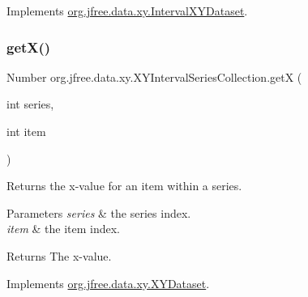 Implements \mbox{\hyperlink{interfaceorg_1_1jfree_1_1data_1_1xy_1_1_interval_x_y_dataset_aed1acf6e36561ce5acc3f6811a2ecef9}{org.\+jfree.\+data.\+xy.\+Interval\+X\+Y\+Dataset}}.

\mbox{\label{classorg_1_1jfree_1_1data_1_1xy_1_1_x_y_interval_series_collection_a0abae4cd2bcaab48244751b896c0ee5d}} 
\subsubsection{\texorpdfstring{get\+X()}{getX()}}
{\footnotesize\ttfamily Number org.\+jfree.\+data.\+xy.\+X\+Y\+Interval\+Series\+Collection.\+getX (\begin{DoxyParamCaption}\item[{int}]{series,  }\item[{int}]{item }\end{DoxyParamCaption})}

Returns the x-\/value for an item within a series.


\begin{DoxyParams}{Parameters}
{\em series} & the series index. \\
\hline
{\em item} & the item index.\\
\hline
\end{DoxyParams}
\begin{DoxyReturn}{Returns}
The x-\/value. 
\end{DoxyReturn}


Implements \mbox{\hyperlink{interfaceorg_1_1jfree_1_1data_1_1xy_1_1_x_y_dataset_a85c75ba5b69b551e96afd29d1732ba22}{org.\+jfree.\+data.\+xy.\+X\+Y\+Dataset}}.

\mbox{\label{classorg_1_1jfree_1_1data_1_1xy_1_1_x_y_interval_series_collection_a466c1c681b804f65c56985ea65ec2a20}} 
